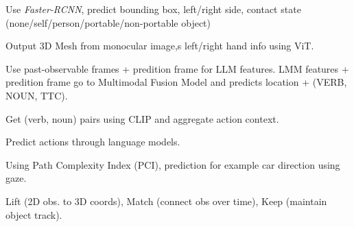 \begin{definition}
    Use \textit{Faster-RCNN}, predict bounding box, left/right side, contact state (none/self/person/portable/non-portable object)
\end{definition}

\begin{definition}[HaMeR]
    Output 3D Mesh from monocular image,s left/right hand info using ViT.
\end{definition}

\begin{definition}[TransFusion]
    Use past-observable frames + predition frame for LLM features. LMM features + predition frame go to Multimodal Fusion Model and predicts location + (VERB, NOUN, TTC).
\end{definition}

\begin{definition}
    Get (verb, noun) pairs using CLIP and aggregate action context.
\end{definition}

\begin{definition}[PALM]
    Predict actions through language models.
\end{definition}

\begin{definition}
    Using Path Complexity Index (PCI), prediction for example car direction using gaze.
\end{definition}

\begin{definition}[LMK]
    Lift (2D obs. to 3D coords), Match (connect obs over time), Keep (maintain object track).
\end{definition}
